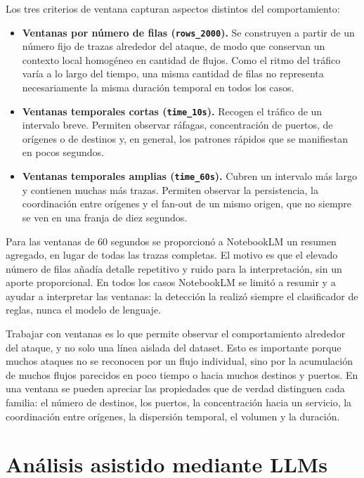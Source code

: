 Los tres criterios de ventana capturan aspectos distintos del comportamiento:

\begin{itemize}
  \item \textbf{Ventanas por número de filas (\texttt{rows\_2000}).} Se construyen a partir de un número fijo de trazas alrededor del ataque, de modo que conservan un contexto local homogéneo en cantidad de flujos. Como el ritmo del tráfico varía a lo largo del tiempo, una misma cantidad de filas no representa necesariamente la misma duración temporal en todos los casos.
  \item \textbf{Ventanas temporales cortas (\texttt{time\_10s}).} Recogen el tráfico de un intervalo breve. Permiten observar ráfagas, concentración de puertos, de orígenes o de destinos y, en general, los patrones rápidos que se manifiestan en pocos segundos.
  \item \textbf{Ventanas temporales amplias (\texttt{time\_60s}).} Cubren un intervalo más largo y contienen muchas más trazas. Permiten observar la persistencia, la coordinación entre orígenes y el fan-out de un mismo origen, que no siempre se ven en una franja de diez segundos.
\end{itemize}

Para las ventanas de 60 segundos se proporcionó a NotebookLM un resumen agregado, en lugar de todas las trazas completas. El motivo es que el elevado número de filas añadía detalle repetitivo y ruido para la interpretación, sin un aporte proporcional. En todos los casos NotebookLM se limitó a resumir y a ayudar a interpretar las ventanas: la detección la realizó siempre el clasificador de reglas, nunca el modelo de lenguaje.

Trabajar con ventanas es lo que permite observar el comportamiento alrededor del ataque, y no solo una línea aislada del dataset. Esto es importante porque muchos ataques no se reconocen por un flujo individual, sino por la acumulación de muchos flujos parecidos en poco tiempo o hacia muchos destinos y puertos. En una ventana se pueden apreciar las propiedades que de verdad distinguen cada familia: el número de destinos, los puertos, la concentración hacia un servicio, la coordinación entre orígenes, la dispersión temporal, el volumen y la duración.

\section{Análisis asistido mediante LLMs}
\label{sec:alg_llms}

